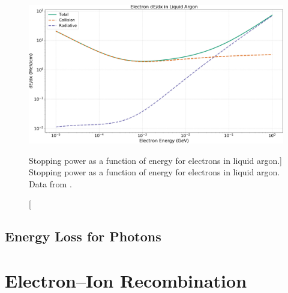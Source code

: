 \begin{figure}

	\centering

	\includegraphics[width=\textwidth]{figures/electron_dedx_argon.pdf}

	\caption
	[Stopping power as a function of energy for electrons in liquid argon.]
	{ Stopping power as a function of energy for electrons in liquid argon. Data
		from \cite{estar}. }

	\label{fig:electron_dedx}

\end{figure}

\subsection{Energy Loss for Photons}

\section{Electron--Ion Recombination}

